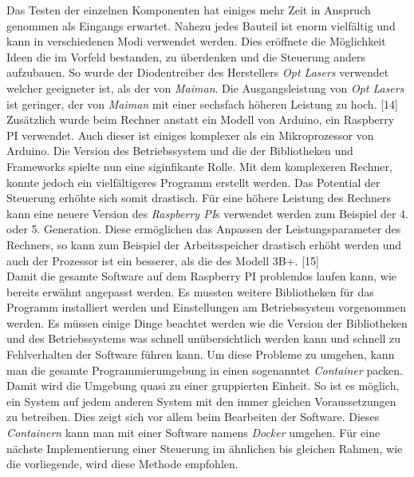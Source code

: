 Das Testen der einzelnen Komponenten hat einiges mehr Zeit in Anspruch genommen als Eingangs erwartet. Nahezu jedes Bauteil ist enorm vielfältig und kann in verschiedenen Modi verwendet werden. Dies eröffnete die Möglichkeit Ideen die im Vorfeld bestanden, zu überdenken und die Steuerung anders aufzubauen. So wurde der Diodentreiber des Herstellers \textit{Opt Lasers} verwendet welcher geeigneter ist, als der von \textit{Maiman}. Die Ausgangsleistung von \textit{Opt Lasers} ist geringer, der von \textit{Maiman} mit einer sechsfach höheren Leistung zu hoch. [14]\\
Zusätzlich wurde beim Rechner anstatt ein Modell von Arduino, ein Raspberry PI verwendet. Auch dieser ist einiges komplexer als ein Mikroprozessor von Arduino. Die Version des Betriebssystem und die der Bibliotheken und Frameworks spielte nun eine siginfikante Rolle. Mit dem komplexeren Rechner, konnte jedoch ein vielfältigeres Programm erstellt werden. Das Potential der Steuerung erhöhte sich somit drastisch.
Für eine höhere Leistung des Rechners kann eine neuere Version des \textit{Raspberry PI}s verwendet werden zum Beispiel der 4. oder 5. Generation. Diese ermöglichen das Anpassen der Leistungsparameter des Rechners, so kann zum Beispiel der Arbeitsspeicher drastisch erhöht werden und auch der Prozessor ist ein besserer, als die des Modell 3B+. [15]\\

Damit die gesamte Software auf dem Raspberry PI problemlos laufen kann, wie bereits erwähnt angepasst werden. Es mussten weitere Bibliotheken für das Programm installiert werden und Einstellungen am Betriebssystem vorgenommen werden. Es müssen einige Dinge beachtet werden wie die Version der Bibliotheken und des Betriebssystems was schnell unübersichtlich werden kann und schnell zu Fehlverhalten der Software führen kann. Um diese Probleme zu umgehen, kann man die gesamte Programmierumgebung in einen sogenanntet \textit{Container} packen. Damit wird die Umgebung quasi zu einer gruppierten Einheit. So ist es möglich, ein System auf jedem anderen System mit den immer gleichen Voraussetzungen zu betreiben. Dies zeigt sich vor allem beim Bearbeiten der Software. Dieses \textit{Containern} kann man mit einer Software namens \textit{Docker} umgehen. Für eine nächste Implementierung einer Steuerung im ähnlichen bis gleichen Rahmen, wie die vorliegende, wird diese Methode empfohlen.